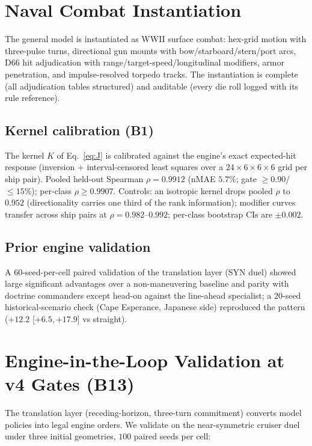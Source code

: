 \documentclass[12pt,a4paper]{article}
\begin{document}
\section{Naval Combat Instantiation}\label{sec:naval}

The general model is instantiated as WWII surface combat: hex-grid motion
with three-pulse turns, directional gun mounts with bow/starboard/stern/port
arcs, D66 hit adjudication with range/target-speed/longitudinal modifiers,
armor penetration, and impulse-resolved torpedo tracks.  The instantiation
is complete (all adjudication tables structured) and auditable (every die
roll logged with its rule reference).

\subsection{Kernel calibration (B1)}\label{sec:kernel}
The kernel $K$ of Eq.~\eqref{eq:J} is calibrated against the engine's exact
expected-hit response (inversion + interval-censored least squares over a
$24\times6\times6\times6$ grid per ship pair).  Pooled held-out Spearman
$\rho=0.9912$ (nMAE $5.7\%$; gate $\ge0.90$/$\le15\%$); per-class
$\rho\ge0.9907$.  Controls: an isotropic kernel drops pooled $\rho$ to
$0.952$ (directionality carries one third of the rank information);
modifier curves transfer across ship pairs at $\rho=0.982$--$0.992$;
per-class bootstrap CIs are $\pm0.002$.

\subsection{Prior engine validation}
A $60$-seed-per-cell paired validation of the translation layer (SYN
duel) showed large significant advantages over a non-maneuvering baseline
and parity with doctrine commanders except head-on against the
line-ahead specialist; a $20$-seed historical-scenario check (Cape
Esperance, Japanese side) reproduced the pattern ($+12.2$ [$+6.5,+17.9$]
vs straight).

\section{Engine-in-the-Loop Validation at v4 Gates (B13)}\label{sec:validation}

The translation layer (receding-horizon, three-turn commitment) converts
model policies into legal engine orders.  We validate on the near-symmetric
cruiser duel under three initial geometries, $100$ paired seeds per cell:
\end{document}
